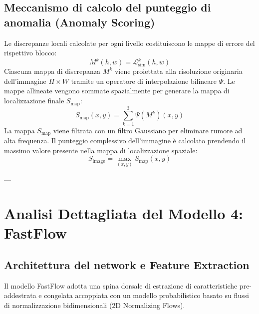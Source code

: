 \subsection{Meccanismo di calcolo del punteggio di anomalia (Anomaly Scoring)}
Le discrepanze locali calcolate per ogni livello costituiscono le mappe di errore del rispettivo blocco:
\begin{equation}
    M^k(h, w) = \mathcal{L}_{\text{sim}}^k(h, w)
\end{equation}
Ciascuna mappa di discrepanza $M^k$ viene proiettata alla risoluzione originaria dell'immagine $H \times W$ tramite un operatore di interpolazione bilineare $\Psi$. Le mappe allineate vengono sommate spazialmente per generare la mappa di localizzazione finale $S_{\text{map}}$:
\begin{equation}
    S_{\text{map}}(x, y) = \sum_{k=1}^3 \Psi(M^k)(x, y)
\end{equation}
La mappa $S_{\text{map}}$ viene filtrata con un filtro Gaussiano per eliminare rumore ad alta frequenza. Il punteggio complessivo dell'immagine è calcolato prendendo il massimo valore presente nella mappa di localizzazione spaziale:
\begin{equation}
    S_{\text{image}} = \max_{(x, y)} S_{\text{map}}(x, y)
\end{equation}

---

\section{Analisi Dettagliata del Modello 4: FastFlow}

\subsection{Architettura del network e Feature Extraction}
Il modello FastFlow adotta una spina dorsale di estrazione di caratteristiche pre-addestrata e congelata accoppiata con un modello probabilistico basato su flussi di normalizzazione bidimensionali (2D Normalizing Flows).

